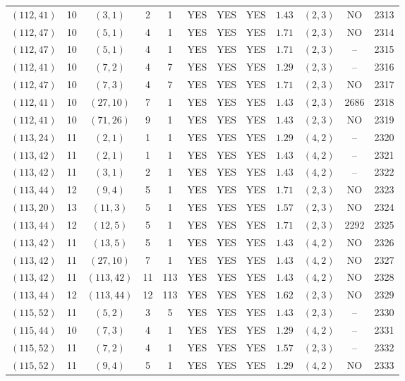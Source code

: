 \begin{longtable}{|c|c|c|c|c|c|c|c|c|c|c|c|}
$(112,41)$ & 10 & $(3,1)$ & 2 & 1 & YES & YES & YES & $1.43$ & $(2,3)$ & NO & 2313\\
$(112,47)$ & 10 & $(5,1)$ & 4 & 1 & YES & YES & YES & $1.71$ & $(2,3)$ & NO & 2314\\
$(112,47)$ & 10 & $(5,1)$ & 4 & 1 & YES & YES & YES & $1.71$ & $(2,3)$ & -- & 2315\\
$(112,41)$ & 10 & $(7,2)$ & 4 & 7 & YES & YES & YES & $1.29$ & $(2,3)$ & -- & 2316\\
$(112,47)$ & 10 & $(7,3)$ & 4 & 7 & YES & YES & YES & $1.71$ & $(2,3)$ & NO & 2317\\
$(112,41)$ & 10 & $(27,10)$ & 7 & 1 & YES & YES & YES & $1.43$ & $(2,3)$ & 2686 & 2318\\
$(112,41)$ & 10 & $(71,26)$ & 9 & 1 & YES & YES & YES & $1.43$ & $(2,3)$ & NO & 2319\\
$(113,24)$ & 11 & $(2,1)$ & 1 & 1 & YES & YES & YES & $1.29$ & $(4,2)$ & -- & 2320\\
$(113,42)$ & 11 & $(2,1)$ & 1 & 1 & YES & YES & YES & $1.43$ & $(4,2)$ & -- & 2321\\
$(113,42)$ & 11 & $(3,1)$ & 2 & 1 & YES & YES & YES & $1.43$ & $(4,2)$ & -- & 2322\\
$(113,44)$ & 12 & $(9,4)$ & 5 & 1 & YES & YES & YES & $1.71$ & $(2,3)$ & NO & 2323\\
$(113,20)$ & 13 & $(11,3)$ & 5 & 1 & YES & YES & YES & $1.57$ & $(2,3)$ & NO & 2324\\
$(113,44)$ & 12 & $(12,5)$ & 5 & 1 & YES & YES & YES & $1.71$ & $(2,3)$ & 2292 & 2325\\
$(113,42)$ & 11 & $(13,5)$ & 5 & 1 & YES & YES & YES & $1.43$ & $(4,2)$ & NO & 2326\\
$(113,42)$ & 11 & $(27,10)$ & 7 & 1 & YES & YES & YES & $1.43$ & $(4,2)$ & NO & 2327\\
$(113,42)$ & 11 & $(113,42)$ & 11 & 113 & YES & YES & YES & $1.43$ & $(4,2)$ & NO & 2328\\
$(113,44)$ & 12 & $(113,44)$ & 12 & 113 & YES & YES & YES & $1.62$ & $(2,3)$ & NO & 2329\\
$(115,52)$ & 11 & $(5,2)$ & 3 & 5 & YES & YES & YES & $1.43$ & $(2,3)$ & -- & 2330\\
$(115,44)$ & 10 & $(7,3)$ & 4 & 1 & YES & YES & YES & $1.29$ & $(4,2)$ & -- & 2331\\
$(115,52)$ & 11 & $(7,2)$ & 4 & 1 & YES & YES & YES & $1.57$ & $(2,3)$ & -- & 2332\\
$(115,52)$ & 11 & $(9,4)$ & 5 & 1 & YES & YES & YES & $1.29$ & $(4,2)$ & NO & 2333\\

\end{longtable}
